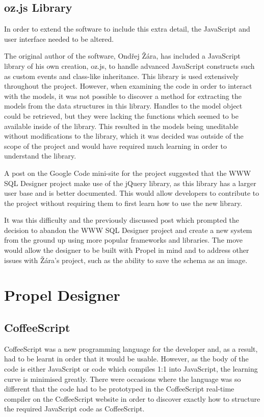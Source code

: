 \subsection{oz.js Library}
In order to extend the software to include this extra detail, the Java\-Script and user interface needed to be altered.

The original author of the software, Ond\v{r}ej \v{Z}\'{a}ra, has included a Java\-Script library of his own creation, oz.js, to handle advanced Java\-Script constructs such as custom events and class-like inheritance. This library is used extensively throughout the project. However, when examining the code in order to interact with the models, it was not possible to discover a method for extracting the models from the data structures in this library. Handles to the model object could be retrieved, but they were lacking the functions which seemed to be available inside of the library. This resulted in the models being uneditable without modifications to the library, which it was decided was outside of the scope of the project and would have required much learning in order to understand the library.

A post on the Google Code mini-site for the project suggested that the WWW SQL Designer project make use of the jQuery library, as this library has a larger user base and is better documented. This would allow developers to contribute to the project without requiring them to first learn how to use the new library.

It was this difficulty and the previously discussed post which prompted the decision to abandon the WWW SQL Designer project and create a new system from the ground up using more popular frameworks and libraries. The move would allow the designer to be built with Propel in mind and to address other issues with \v{Z}\'{a}ra's project, such as the ability to save the schema as an image.

\section{Propel Designer}
\subsection{CoffeeScript}
CoffeeScript was a new programming language for the developer and, as a result, had to be learnt in order that it would be usable. However, as the body of the code is either Java\-Script or code which compiles 1:1 into Java\-Script, the learning curve is minimised greatly. There were occasions where the language was so different that the code had to be prototyped in the Coffee\-Script real-time compiler on the Coffee\-Script website in order to discover exactly how to structure the required Java\-Script code as Coffee\-Script.

